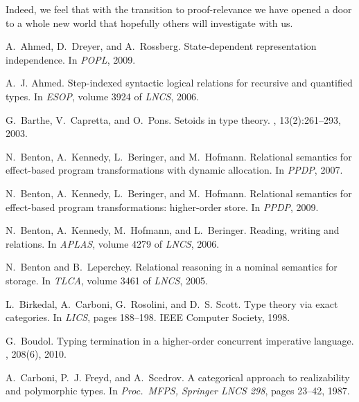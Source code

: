 \documentclass[orivec]{llncs}
\newif\iffull\fullfalse
\begin{document}
Indeed, we feel that with the transition to proof-relevance we have
opened a door to a whole new world that hopefully others will
investigate with us. 
\iffull

\else
\vspace{-2mm}
\begin{thebibliography}{10}

A.~Ahmed, D.~Dreyer, and A.~Rossberg.
\newblock State-dependent representation independence.
\newblock In {\em POPL}, 2009.

A.~J. Ahmed.
\newblock Step-indexed syntactic logical relations for recursive and
quantified
  types.
\newblock In {\em ESOP}, volume 3924 of {\em LNCS}, 2006.

G.~Barthe, V.~Capretta, and O.~Pons.
\newblock Setoids in type theory.
, 13(2):261--293, 2003.



N.~Benton, A.~Kennedy, L.~Beringer, and M.~Hofmann.
\newblock Relational semantics for effect-based program transformations
with
  dynamic allocation.
\newblock In {\em PPDP}, 2007.

N.~Benton, A.~Kennedy, L.~Beringer, and M.~Hofmann.
\newblock Relational semantics for effect-based program transformations:
  higher-order store.
\newblock In {\em PPDP}, 2009.

N.~Benton, A.~Kennedy, M.~Hofmann, and L.~Beringer.
\newblock Reading, writing and relations.
\newblock In {\em APLAS}, volume 4279 of {\em LNCS}, 2006.

N.~Benton and B.~Leperchey.
\newblock Relational reasoning in a nominal semantics for storage.
\newblock In {\em TLCA}, volume 3461 of {\em LNCS}, 2005.

L.~Birkedal, A.~Carboni, G.~Rosolini, and D.~S. Scott.
\newblock Type theory via exact categories.
\newblock In {\em LICS}, pages 188--198. IEEE Computer Society, 1998.

G.~Boudol.
\newblock Typing termination in a higher-order concurrent imperative
language.
, 208(6), 2010.

A.~Carboni, P.~J. Freyd, and A.~Scedrov.
\newblock A categorical approach to realizability and polymorphic types.
\newblock In {\em Proc.\ MFPS, Springer LNCS 298}, pages 23--42, 1987.


\end{thebibliography}
\end{document}

